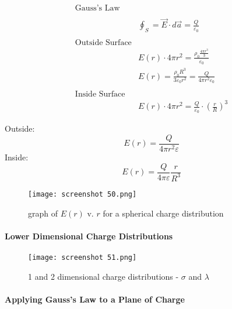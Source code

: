 \documentclass[svgnames]{article}   	%
\begin{document}
\begin{align*}
  \text{Gauss's Law} \\\\
  &\oint_S = \vec{E} \cdot d\vec{a} = \frac{Q}{\varepsilon_0}\\\\
  \text{Outside Surface}\\
  &E(r) \cdot 4\pi r^2 = \frac{\rho_0 \frac{4\pi
  r^3}{3}}{\varepsilon_0 } \\
  &E(r) = \frac{\rho_0 R^3}{3\varepsilon_0 r^2} = \frac{Q}{4\pi r^2
  \varepsilon_0} \\\\
  \text{Inside Surface} \\
  &E(r) \cdot 4\pi r^2 = \frac{Q}{\varepsilon_0} \cdot \left(\frac{r}{R}\right)^3
\end{align*}

\begin{tcolorbox}	
    Outside: 
    \[E(r) = \frac{Q}{4\pi r^2 \varepsilon} \]
  Inside: 
  \[E(r) = \frac{Q}{4\pi \varepsilon} \frac{r}{R^3} \]
\end{tcolorbox}	



\begin{figure}[H]
  \centering
    \texttt{[image: screenshot 50.png]}
    \caption{graph of $E(r)$ v.  $r$ for a spherical charge distribution}
\end{figure}





\paragraph{Lower Dimensional Charge Distributions}


\begin{figure}[H]
  \centering
    \texttt{[image: screenshot 51.png]}
    \caption{1 and 2 dimensional charge distributions - $\sigma$ and $\lambda$}
\end{figure}




\paragraph{Applying Gauss's Law to a Plane of Charge}
\end{document}
